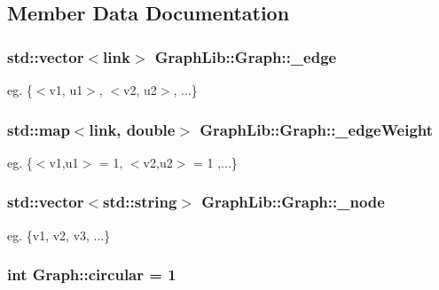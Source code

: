 \subsection{Member Data Documentation}
\hypertarget{classGraphLib_1_1Graph_a784b9952b6bd927abf0068c10b21fb4f}{
\subsubsection[{\-\_\-edge}]{\setlength{\rightskip}{0pt plus 5cm}std\-::vector$<${\bf link}$>$ Graph\-Lib\-::\-Graph\-::\-\_\-edge\hspace{0.3cm}{\ttfamily [private]}}}\label{classGraphLib_1_1Graph_a784b9952b6bd927abf0068c10b21fb4f}
eg. \{$<$v1, u1$>$, $<$v2, u2$>$, ...\} \hypertarget{classGraphLib_1_1Graph_a1fafe6bfd34afe63874f942408a5b858}{
\subsubsection[{\-\_\-edge\-Weight}]{\setlength{\rightskip}{0pt plus 5cm}std\-::map$<${\bf link}, double$>$ Graph\-Lib\-::\-Graph\-::\-\_\-edge\-Weight\hspace{0.3cm}{\ttfamily [private]}}}\label{classGraphLib_1_1Graph_a1fafe6bfd34afe63874f942408a5b858}
eg. \{$<$v1,u1$>$ = 1, $<$v2,u2$>$ = 1 ,...\} \hypertarget{classGraphLib_1_1Graph_a2d57aa86954b2fc260c8699dd9fdcd66}{
\subsubsection[{\-\_\-node}]{\setlength{\rightskip}{0pt plus 5cm}std\-::vector$<$std\-::string$>$ Graph\-Lib\-::\-Graph\-::\-\_\-node\hspace{0.3cm}{\ttfamily [private]}}}\label{classGraphLib_1_1Graph_a2d57aa86954b2fc260c8699dd9fdcd66}
eg. \{v1, v2, v3, ...\} \hypertarget{classGraphLib_1_1Graph_ae60cf97b7bef2ca4d930b251581a3e7b}{
\subsubsection[{circular}]{\setlength{\rightskip}{0pt plus 5cm}int Graph\-::circular = 1\hspace{0.3cm}{\ttfamily [static]}}}\label{classGraphLib_1_1Graph_ae60cf97b7bef2ca4d930b251581a3e7b}
